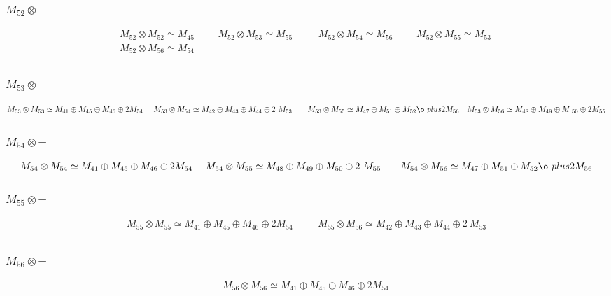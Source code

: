 \subsubsection{$M_52\otimes -$}
\begin{align*}
M_{52} \otimes M_{52} \simeq M_{45} &&& M_{52} \otimes M_{53} \simeq M_{55} &&\
& M_{52} \otimes M_{54} \simeq M_{56} &&& M_{52} \otimes M_{55} \simeq M_{53}\
\\
M_{52} \otimes M_{56} \simeq M_{54}\\
\end{align*}

\subsubsection{$M_53\otimes -$}
\begin{align*}
M_{53} \otimes M_{53} \simeq M_{41} \oplus M_{45} \oplus M_{46} \oplus 2 M_{54\
} &&& M_{53} \otimes M_{54} \simeq M_{42} \oplus M_{43} \oplus M_{44} \oplus 2\
 M_{53} &&& M_{53} \otimes M_{55} \simeq M_{47} \oplus M_{51} \oplus M_{52} \o\
plus 2 M_{56} &&& M_{53} \otimes M_{56} \simeq M_{48} \oplus M_{49} \oplus M_{\
50} \oplus 2 M_{55}\\
\end{align*}

\subsubsection{$M_54\otimes -$}
\begin{align*}
M_{54} \otimes M_{54} \simeq M_{41} \oplus M_{45} \oplus M_{46} \oplus 2 M_{54\
} &&& M_{54} \otimes M_{55} \simeq M_{48} \oplus M_{49} \oplus M_{50} \oplus 2\
 M_{55} &&& M_{54} \otimes M_{56} \simeq M_{47} \oplus M_{51} \oplus M_{52} \o\
plus 2 M_{56}\\
\end{align*}

\subsubsection{$M_55\otimes -$}
\begin{align*}
M_{55} \otimes M_{55} \simeq M_{41} \oplus M_{45} \oplus M_{46} \oplus 2 M_{54\
} &&& M_{55} \otimes M_{56} \simeq M_{42} \oplus M_{43} \oplus M_{44} \oplus 2\
 M_{53}\\
\end{align*}

\subsubsection{$M_56\otimes -$}
\begin{align*}
M_{56} \otimes M_{56} \simeq M_{41} \oplus M_{45} \oplus M_{46} \oplus 2 M_{54\
}\\
\end{align*}

